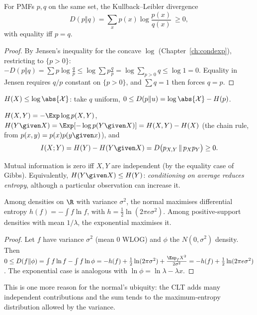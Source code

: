 \begin{theorem}\label{thm:gibbs}
For PMFs $p,q$ on the same set, the Kullback--Leibler divergence
\[
D(p\Vert q)=\sum_xp(x)\log\frac{p(x)}{q(x)}\ \ge0,
\]
with equality iff $p=q$.
\end{theorem}
\begin{proof}
By Jensen's inequality for the concave $\log$ (Chapter~\ref{ch:condexp}), restricting to $\{p>0\}$:
$-D(p\Vert q)=\sum p\log\frac qp\le\log\sum p\frac qp=\log\sum_{p>0}q\le\log1=0$. Equality in Jensen
requires $q/p$ constant on $\{p>0\}$, and $\sum q=1$ then forces $q=p$.
\end{proof}

\begin{corollary}
$H(X)\le\log\abs{\mathcal X}$: take $q$ uniform, $0\le D(p\Vert u)=\log\abs{\mathcal X}-H(p)$.
\end{corollary}

\begin{definition}
$H(X,Y)=-\Exp\log p(X,Y)$, $H(Y\given X)=\Exp[-\log p(Y\given X)]=H(X,Y)-H(X)$ (the chain rule, from
$p(x,y)=p(x)p(y\given x)$), and
\[
I(X;Y)=H(Y)-H(Y\given X)=D\bigl(p_{X,Y}\,\Vert\,p_Xp_Y\bigr)\ge0 .
\]
\end{definition}
Mutual information is zero iff $X,Y$ are independent (by the equality case of Gibbs). Equivalently,
$H(Y\given X)\le H(Y)$: \emph{conditioning on average reduces entropy}, although a particular
observation can increase it.

\begin{theorem}
Among densities on $\R$ with variance $\sigma^2$, the normal maximises differential entropy
$h(f)=-\int f\ln f$, with $h=\tfrac12\ln(2\pi e\sigma^2)$. Among positive-support densities with mean
$1/\lambda$, the exponential maximises it.
\end{theorem}
\begin{proof}
Let $f$ have variance $\sigma^2$ (mean $0$ WLOG) and $\phi$ the $N(0,\sigma^2)$ density. Then
$0\le D(f\Vert\phi)=\int f\ln f-\int f\ln\phi=-h(f)+\tfrac12\ln(2\pi\sigma^2)+\frac{\Exp_f X^2}{2\sigma^2}=
-h(f)+\tfrac12\ln(2\pi e\sigma^2)$. The exponential case is analogous with
$\ln\phi=\ln\lambda-\lambda x$.
\end{proof}

This is one more reason for the normal's ubiquity: the CLT adds many independent contributions and the
sum tends to the maximum-entropy distribution allowed by the variance.

